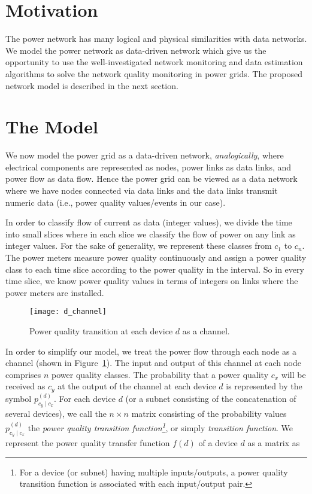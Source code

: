 \label{chap:networkModel}
\section{Motivation}
The power network has many logical and physical similarities with data networks. We model the power network as data-driven network which give us the opportunity to use the well-investigated network monitoring and data estimation algorithms to solve the network quality monitoring in power grids. The proposed network model is described in the next section.

\section{The Model}
We now model the power grid as a data-driven network, {\em analogically}, where electrical components are represented as nodes, power links as data links, and power flow as data flow. Hence the power grid can be viewed as a data network where we have nodes connected via data links and the data links transmit numeric data (i.e., power quality values/events in our case).

In order to classify flow of current as data (integer values), we divide the time into small slices where in each slice we classify the flow of power on any link as integer values. For the sake of generality, we represent these classes from $c_1$ to $c_n$. The power meters measure power quality continuously and assign a power quality class to each time slice according to the power quality in the interval. So in every time slice, we know power quality values in terms of integers on links where the power meters are installed. 

\begin{figure}[!t]
    \centering
    \texttt{[image: d\_channel]}
    \caption{Power quality transition at each device $d$ as a channel.}
    \label{fig:d_channel}
\end{figure}

In order to simplify our model, we treat the power flow through each node as a channel (shown in Figure~\ref{fig:d_channel}). The input and output of this channel at each node comprises $n$ power quality classes. The probability that a power quality $c_x$ will be received as $c_y$ at the output of the channel at each device $d$ is represented by the symbol $p_{c_y  \mid c_x}^{(d)}$. For each device $d$ (or a subnet consisting of the concatenation of several devices), we call the $n\times n$ matrix consisting of the probability values  $p_{c_y  \mid c_x}^{(d)}$ the {\em power quality transition function\footnote{For a device (or subnet) having multiple inputs/outputs, a power quality transition function is associated with each input/output pair.}}, or simply {\em transition function}. We represent the power quality transfer function $f(d)$ of a device $d$ as a matrix as

